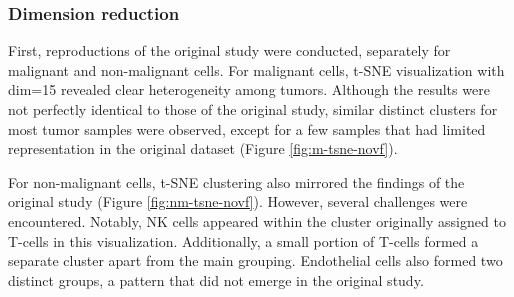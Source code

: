 \documentclass[11pt]{article}
\begin{document}
\begin{multicols}{2}

    \subsubsection{Dimension reduction}
    \noindent
    First, reproductions of the original study were conducted, separately for malignant and non-malignant cells. For malignant cells, t-SNE visualization with dim=15 revealed clear heterogeneity among tumors. Although the results were not perfectly identical to those of the original study, similar distinct clusters for most tumor samples were observed, except for a few samples that had limited representation in the original dataset (Figure \ref{fig:m-tsne-novf}).

    For non-malignant cells, t-SNE clustering also mirrored the findings of the original study (Figure \ref{fig:nm-tsne-novf}). However, several challenges were encountered. Notably, NK cells appeared within the cluster originally assigned to T-cells in this visualization. Additionally, a small portion of T-cells formed a separate cluster apart from the main grouping. Endothelial cells also formed two distinct groups, a pattern that did not emerge in the original study.

\end{multicols}




\end{document}
